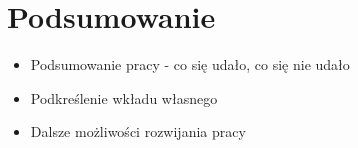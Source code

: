 \chapter{Podsumowanie}
\label{cha:rozdzial6}

\begin{itemize}
\item Podsumowanie pracy - co się udało, co się nie udało
\item Podkreślenie wkładu własnego
\item Dalsze możliwości rozwijania pracy
\end{itemize}